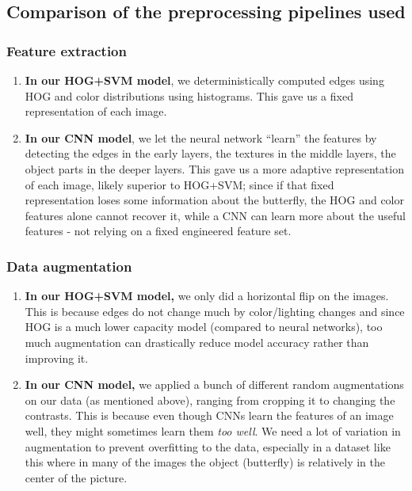 \documentclass[10pt]{article} %
\begin{document}
\subsection{Comparison of the preprocessing pipelines used}
\subsubsection{Feature extraction}
\begin{enumerate}
  \item \textbf{In our HOG+SVM model}, we deterministically computed edges using HOG and color distributions using histograms. This gave us a fixed representation of each image.
  \item \textbf{In our CNN model}, we let the neural network ``learn'' the features by detecting the edges in the early layers, the textures in the middle layers, the object parts in the deeper layers. This gave us a more adaptive representation of each image, likely superior to HOG+SVM; since if that fixed representation loses some information about the butterfly, the HOG and color features alone cannot recover it, while a CNN can learn more about the useful features - not relying on a fixed engineered feature set.
\end{enumerate}
\subsubsection{Data augmentation}
\begin{enumerate}
  \item \textbf{In our HOG+SVM model,} we only did a horizontal flip on the images. This is because edges do not change much by color/lighting changes and since HOG is a much lower capacity model (compared to neural networks), too much augmentation can drastically reduce model accuracy rather than improving it.
  \item \textbf{In our CNN model,} we applied a bunch of different random augmentations on our data (as mentioned above), ranging from cropping it to changing the contrasts. This is because even though CNNs learn the features of an image well, they might sometimes learn them \textit{too well}. We need a lot of variation in augmentation to prevent overfitting to the data, especially in a dataset like this where in many of the images the object (butterfly) is relatively in the center of the picture.
\end{enumerate}
\end{document}
